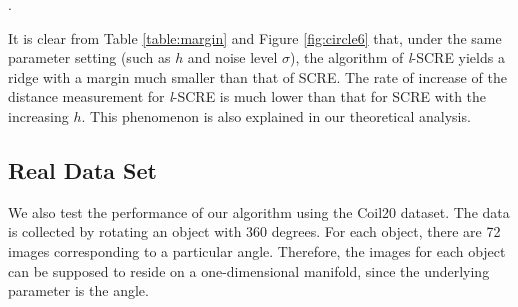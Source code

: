 \documentclass[aos,preprint]{imsart}
\theoremstyle{remark}
\begin{document}
\begin{table}[h]
\caption{The margin and Hausdorff between $\cal \hat{G}$ and ${\cal \hat{G}}_{\ell}$. $\mathcal M$ varies with $h$ for SCRE and {\it l}-SCRE}.
\label{table:margin}
\end{table}

It is clear from Table \ref{table:margin} and Figure \ref{fig:circle6} that, under the same parameter setting (such as $h$ and noise level $\sigma$), the algorithm of {\it l}-SCRE yields a ridge with a margin much smaller than that of SCRE. The rate of increase of the distance measurement for {\it l}-SCRE is much lower than that for SCRE with the increasing $h$. This phenomenon is also explained in our theoretical analysis.




\subsection{Real Data Set}
We also test the performance of our algorithm using the Coil20 \cite{Coil20} dataset. The data is collected by rotating an object with 360 degrees. For each object, there are 72 images corresponding to a particular angle. Therefore, the images for each object can be supposed to reside on a one-dimensional manifold, since the underlying parameter is the angle.
\end{document}

